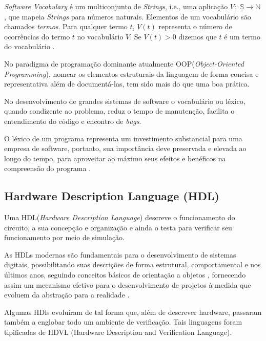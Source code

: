\documentclass[12pt, twocolumn, a4paper]{article}
\begin{document}
 \textit{Software Vocabulary} é um multiconjunto de \textit{Strings}, i.e., uma aplicação $V:$ $\mathbb{S}\rightarrow\mathbb{N}$, que mapeia \textit{Strings} para números naturais. Elementos de um vocabulário são chamados \textit{termos}. Para qualquer termo $t$, $V(t)$ representa o número de ocorrências do termo $t$ no vocabulário $V$. Se $V(t)>0$ dizemos que $t$ é um termo do vocabulário \cite{Santos2015}.


No paradigma de programação dominante atualmente OOP(\textit{Object-Oriented Programming}), nomear os elementos estruturais da linguagem de forma concisa e representativa além de documentá-las, tem sido mais do que uma boa prática.

 No desenvolvimento de grandes sistemas de software o vocabulário ou léxico, quando condizente ao problema, reduz o tempo de manutenção, facilita o entendimento do código e encontro de \textit{bugs}.

O léxico de um programa representa um investimento substancial para uma empresa de software, portanto, sua importância deve preservada e elevada ao longo do tempo, para aproveitar ao máximo seus efeitos e benéficos na compreensão do programa \cite{Antoniol2007}.

	\subsection{Hardware Description Language (HDL)}

\quad Uma HDL(\textit{Hardware Description Language}) descreve o funcionamento do circuito, a sua concepção e organização e ainda o testa para verificar seu funcionamento por meio de simulação\cite{Miller-Karlow}.

As HDLs modernas são fundamentais para o desenvolvimento de sistemas digitais, possibilitando suas descrições de forma estrutural, comportamental e nos últimos anos, seguindo conceitos básicos de orientação a objetos \cite{Hahanov2008}, fornecendo assim um mecanismo efetivo para o desenvolvimento de projetos à medida que evoluem da abstração para a realidade \cite{Navabi2015}.

Algumas HDls evoluíram de tal forma que, além de descrever hardware, passaram também a englobar todo um ambiente de verificação. Tais linguagens foram tipificadas de HDVL (Hardware Description and Verification Language).
\end{document}
